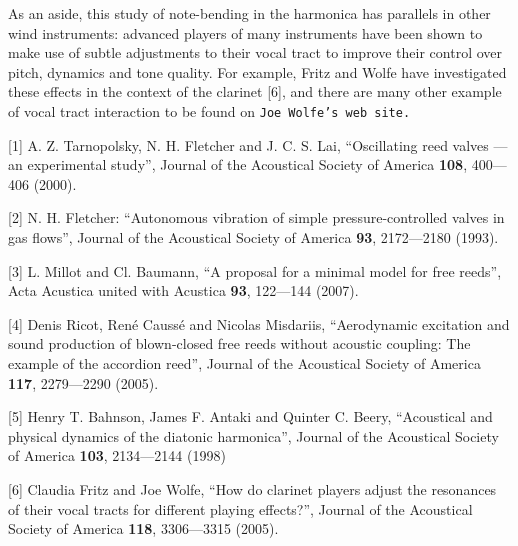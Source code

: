   As an aside, this study of note-bending in the harmonica has parallels in 
  other wind instruments: advanced players of many instruments have been shown 
  to make use of subtle adjustments to their vocal tract to improve their 
  control over pitch, dynamics and tone quality. For example, Fritz and Wolfe 
  have investigated these effects in the context of the clarinet [6], and there 
  are many other example of vocal tract interaction to be found on \tt{}Joe 
  Wolfe’s web site\rm{}. 



  \sectionreferences{}[1] A. Z. Tarnopolsky, N. H. Fletcher and J. C. S. Lai, 
  “Oscillating reed valves — an experimental study”, Journal of the Acoustical 
  Society of America \textbf{108}, 400—406 (2000). 

  [2] N. H. Fletcher: “Autonomous vibration of simple pressure-controlled 
  valves in gas flows”, Journal of the Acoustical Society of America 
  \textbf{93}, 2172—2180 (1993). 

  [3] L. Millot and Cl. Baumann, “A proposal for a minimal model for free 
  reeds”, Acta Acustica united with Acustica \textbf{93}, 122—144 (2007). 

  [4] Denis Ricot, René Caussé and Nicolas Misdariis, “Aerodynamic excitation 
  and sound production of blown-closed free reeds without acoustic coupling: 
  The example of the accordion reed”, Journal of the Acoustical Society of 
  America \textbf{117}, 2279—2290 (2005). 

  [5] Henry T. Bahnson, James F. Antaki and Quinter C. Beery, “Acoustical and 
  physical dynamics of the diatonic harmonica”, Journal of the Acoustical 
  Society of America \textbf{103}, 2134—2144 (1998) 

  [6] Claudia Fritz and Joe Wolfe, “How do clarinet players adjust the 
  resonances of their vocal tracts for different playing effects?”, Journal of 
  the Acoustical Society of America \textbf{118}, 3306—3315 (2005). 